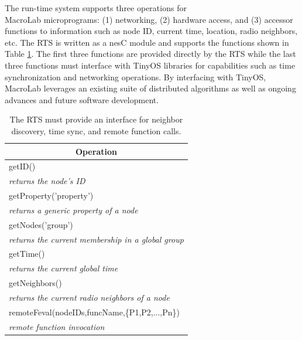 The run-time system supports three operations for \\MacroLab
microprograms: (1) networking, (2) hardware access, and (3) accessor
functions to information such as node ID, current time, location,
radio neighbors, etc.  The RTS is written as a nesC module and supports
the functions shown in Table \ref{table:lib}.  The first three
functions are provided directly by the RTS while the
last three functions must interface with TinyOS libraries for capabilities
such as time synchronization and networking operations.  By interfacing
with TinyOS, MacroLab leverages an existing suite of distributed
algorithms as well as ongoing advances and future software
development.  

\begin{table}[!htb]
  \centering
   \begin{tabular}{| l |}
     \hline
     \multicolumn{1}{|c|}{Operation} \\
     \hline
     getID() \\
     \textit{returns the node's ID}\\
     \hline
     getProperty('property') \\
     \textit{returns a generic property of a node} \\
     \hline
     getNodes('group') \\
     \textit{returns the current membership in a global group}\\
     \hline
     getTime() \\
     \textit{returns the current global time} \\
     \hline
     getNeighbors() \\
     \textit{returns the current radio neighbors of a node}\\
     \hline
     remoteFeval(nodeIDs,funcName,\{P1,P2,...,Pn\}) \\
     \textit{remote function invocation}\\
     \hline
   \end{tabular}
   \caption[Functions supported by the Run-Time System]{The RTS must provide an interface for
   neighbor discovery, time sync, and remote function calls.}
   \label{table:lib}
\end{table}

